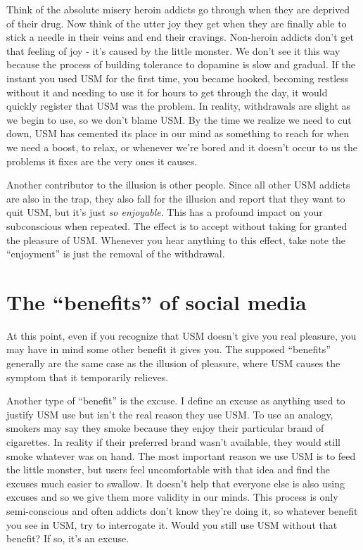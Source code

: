 \documentclass[
  openany]{book}
\begin{document}
Think of the absolute misery heroin addicts go through when they are deprived of their drug. Now think of the utter joy they get when they are finally able to stick a needle in their veins and end their cravings. Non-heroin addicts don't get that feeling of joy - it's caused by the little monster. We don't see it this way because the process of building tolerance to dopamine is slow and gradual. If the instant you used USM for the first time, you became hooked, becoming restless without it and needing to use it for hours to get through the day, it would quickly register that USM was the problem. In reality, withdrawals are slight as we begin to use, so we don't blame USM. By the time we realize we need to cut down, USM has cemented its place in our mind as something to reach for when we need a boost, to relax, or whenever we're bored and it doesn't occur to us the problems it fixes are the very ones it causes.

Another contributor to the illusion is other people. Since all other USM addicts are also in the trap, they also fall for the illusion and report that they want to quit USM, but it's just \emph{so enjoyable}. This has a profound impact on your subconscious when repeated. The effect is to accept without taking for granted the pleasure of USM. Whenever you hear anything to this effect, take note the ``enjoyment'' is just the removal of the withdrawal.

\chapter{The ``benefits'' of social media}\label{benefits}

At this point, even if you recognize that USM doesn't give you real pleasure, you may have in mind some other benefit it gives you. The supposed ``benefits'' generally are the same case as the illusion of pleasure, where USM causes the symptom that it temporarily relieves.

Another type of ``benefit'' is the excuse. I define an excuse as anything used to justify USM use but isn't the real reason they use USM. To use an analogy, smokers may say they smoke because they enjoy their particular brand of cigarettes. In reality if their preferred brand wasn't available, they would still smoke whatever was on hand. The most important reason we use USM is to feed the little monster, but users feel uncomfortable with that idea and find the excuses much easier to swallow. It doesn't help that everyone else is also using excuses and so we give them more validity in our minds. This process is only semi-conscious and often addicts don't know they're doing it, so whatever benefit you see in USM, try to interrogate it. Would you still use USM without that benefit? If so, it's an excuse.
\end{document}

